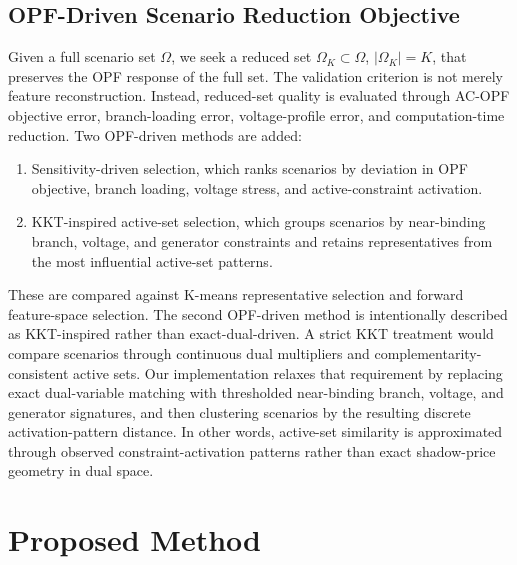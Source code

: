 \documentclass[journal]{IEEEtran}
\begin{document}
\subsection{OPF-Driven Scenario Reduction Objective}
Given a full scenario set $\Omega$, we seek a reduced set $\Omega_K\subset\Omega$, $|\Omega_K|=K$, that preserves the OPF response of the full set. The validation criterion is not merely feature reconstruction. Instead, reduced-set quality is evaluated through AC-OPF objective error, branch-loading error, voltage-profile error, and computation-time reduction. Two OPF-driven methods are added:
\begin{enumerate}
\item Sensitivity-driven selection, which ranks scenarios by deviation in OPF objective, branch loading, voltage stress, and active-constraint activation.
\item KKT-inspired active-set selection, which groups scenarios by near-binding branch, voltage, and generator constraints and retains representatives from the most influential active-set patterns.
\end{enumerate}
These are compared against K-means representative selection and forward feature-space selection. The second OPF-driven method is intentionally described as KKT-inspired rather than exact-dual-driven. A strict KKT treatment would compare scenarios through continuous dual multipliers and complementarity-consistent active sets. Our implementation relaxes that requirement by replacing exact dual-variable matching with thresholded near-binding branch, voltage, and generator signatures, and then clustering scenarios by the resulting discrete activation-pattern distance. In other words, active-set similarity is approximated through observed constraint-activation patterns rather than exact shadow-price geometry in dual space.

\section{Proposed Method}
\end{document}
